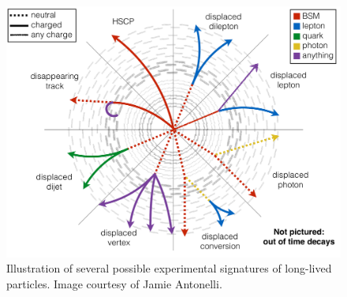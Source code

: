 \begin{figure}[hbtp]
\centering
\includegraphics[scale=0.4]{figures/overview/llp_signatures.pdf}
\caption{Illustration of several possible experimental signatures of long-lived particles. Image courtesy of Jamie Antonelli.} 
\label{llp_signatures}
\end{figure}